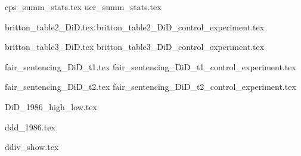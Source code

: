 \documentclass{article}
\begin{document}
\clearpage




{cps_summ_stats.tex}
{ucr_summ_stats.tex}


{britton_table2_DiD.tex}
{britton_table2_DiD_control_experiment.tex}

{britton_table3_DiD.tex}
{britton_table3_DiD_control_experiment.tex}

{fair_sentencing_DiD_t1.tex}
{fair_sentencing_DiD_t1_control_experiment.tex}

{fair_sentencing_DiD_t2.tex}
{fair_sentencing_DiD_t2_control_experiment.tex}

{DiD_1986_high_low.tex}

{ddd_1986.tex}

{ddiv_show.tex}
\end{document}
